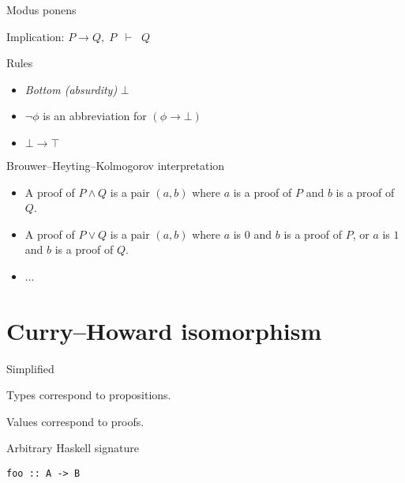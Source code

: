 \documentclass[17pt]{beamer}
\begin{document}
\begin{frame}{Modus ponens}
\begin{center}
Implication: $P \to Q,\; P\;\; \vdash\;\; Q$
\end{center}
\end{frame}

\begin{frame}{Rules}
\begin{itemize}
	\item \emph{Bottom (absurdity)} $\bot$
	\item $\neg \phi$ is an abbreviation for $(\phi \to \bot)$
	\item $\bot \to \top$
\end{itemize}
\end{frame}

\begin{frame}{Brouwer–Heyting–Kolmogorov interpretation}
\begin{itemize}
	\item A proof of $P\wedge Q$ is a pair $(a,b)$ where $a$ is a proof of $P$ and $b$ is a proof of $Q$.
	\item A proof of $P\vee Q$ is a pair $(a,b)$ where $a$ is $0$ and $b$ is a proof of $P$, or $a$ is $1$ and $b$ is a proof of $Q$.
	\item ...
\end{itemize}
\end{frame}

\section{Curry–Howard isomorphism}

\begin{frame}{Simplified}

Types correspond to propositions.

Values correspond to proofs.

\end{frame}

\begin{frame}[fragile]{Arbitrary Haskell signature}

\begin{lstlisting}
foo :: A -> B
\end{lstlisting}

\end{frame}
\end{document}
